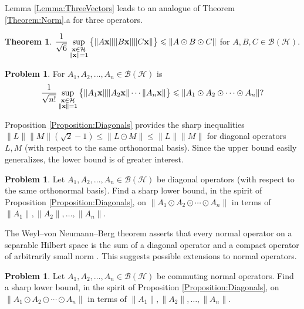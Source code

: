 \documentclass[10pt,reqno]{amsart}
\newcommand{\0}{{\color{lightgray}0}}
\newcommand{\B}{\mathcal{B}}
\renewcommand{\leq}{\leqslant}
\newcommand{\norm}[1]{\| #1 \|}
\newcommand{\h}{\mathcal{H}}
\renewcommand{\vec}[1]{{\bf #1}}
\theoremstyle{definition}
\newcounter{problem}
\newtheorem{Theorem}[equation]{Theorem}
\newtheorem{Problem}[problem]{Problem}
\numberwithin{equation}{section}
\begin{document}
Lemma \ref{Lemma:ThreeVectors} leads to an analogue of Theorem \ref{Theorem:Norm}.a for three operators.

\begin{Theorem}\label{Theorem:Norm2}
$ \displaystyle \frac{1}{\sqrt{6}}\sup_{\substack{\vec{x} \in \h \\ \|\vec{x}\| = 1}} 
\big\{ { \|A\vec{x}\| \|B\vec{x}\| \| C\vec{x} \|} \big\} \leq \| A \odot B \odot C \|$ for $A, B, C \in \B( \h )$.
\end{Theorem}


\begin{Problem}
For $A_1, A_2, \ldots, A_n \in \B(\h)$ is
\begin{equation}\label{QQ}
    \frac{1}{\sqrt{n!}}\sup_{ \substack{\vec{x} \in \h \\ \|\vec{x}\| = 1}} 
    \big\{ { \|A_1\vec{x}\| \|A_2\vec{x}\|\cdots \| A_n \vec{x} \|} \big\} \leq\| A_1 \odot A_2 \odot \cdots \odot A_n \| ?
\end{equation}
\end{Problem}

Proposition \ref{Proposition:Diagonals} provides the sharp inequalities 
$ \|L\| \| M \| (\sqrt{2}-1) \leqslant \| L \odot M \| \leq \|L\| \|M\|$ for diagonal operators $L,M$
(with respect to the same orthonormal basis).
Since the upper bound easily generalizes, the lower bound is of greater interest.

\begin{Problem}
Let $A_1, A_2, \ldots, A_n \in \B(\h)$ be diagonal operators (with respect to the same orthonormal basis).
Find a sharp lower bound, in the spirit of Proposition \ref{Proposition:Diagonals}, 
on $\norm{ A_1 \odot A_2 \odot \cdots \odot A_n}$ in terms of $\norm{A_1}, \norm{A_2},\ldots,\norm{A_n}$.
\end{Problem}

The Weyl--von Neumann--Berg theorem asserts that every normal operator on a separable Hilbert space
is the sum of a diagonal operator and a compact operator of arbitrarily small norm \cite[Cor.~II.4.2]{MR1402012}.
This suggests possible extensions to normal operators.

\begin{Problem}
Let $A_1, A_2, \ldots, A_n \in \B(\h)$ be commuting normal operators.
Find a sharp lower bound, in the spirit of Proposition \ref{Proposition:Diagonals}, 
on $\norm{ A_1 \odot A_2 \odot \cdots \odot A_n}$ in terms of $\norm{A_1}, \norm{A_2},\ldots,\norm{A_n}$.
\end{Problem}
\end{document}
